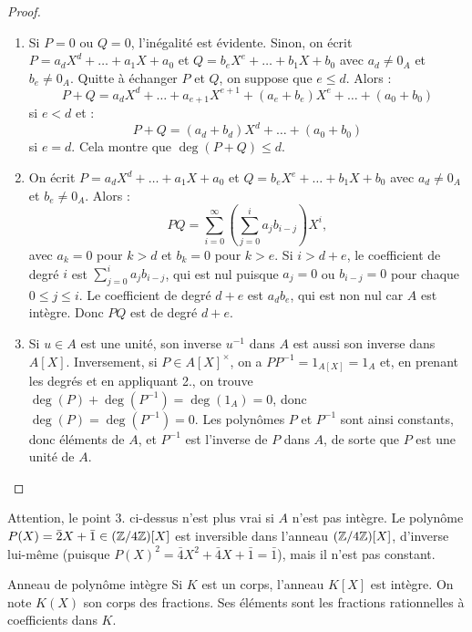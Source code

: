 \documentclass[]{report}
\begin{document}
\begin{proof}
    \begin{enumerate}
        \item Si $P = 0$ ou $Q = 0$, l'inégalité est évidente. Sinon, on écrit $P = a_d X^d + \dots + a_1 X + a_0$ et $Q = b_e X^e + \dots + b_1 X + b_0$ avec $a_d \neq 0_A$ et $b_e \neq 0_A$. Quitte à échanger $P$ et $Q$, on suppose que $e \le d$. Alors :
        \[P + Q = a_d X^d + \dots + a_{e+1} X^{e+1} + (a_e + b_e) X^e + \dots + (a_0 + b_0)\]
        si $e < d$ et :
        \[P + Q = (a_d + b_d) X^d + \dots + (a_0 + b_0)\]
        si $e = d$. Cela montre que $\deg(P + Q) \le d$.
        \item On écrit $P = a_d X^d + \dots + a_1 X + a_0$ et $Q = b_e X^e + \dots + b_1 X + b_0$ avec $a_d \neq 0_A$ et $b_e \neq 0_A$. Alors :
        \[PQ = \sum_{i=0}^{\infty} \left( \sum_{j=0}^{i} a_j b_{i-j} \right) X^i,\]
        avec $a_k = 0$ pour $k > d$ et $b_k = 0$ pour $k > e$. Si $i > d + e$, le coefficient de degré $i$ est $\sum_{j=0}^{i} a_j b_{i-j}$, qui est nul puisque $a_j = 0$ ou $b_{i-j} = 0$ pour chaque $0 \le j \le i$. Le coefficient de degré $d + e$ est $a_d b_e$, qui est non nul car $A$ est intègre. Donc $PQ$ est de degré $d + e$.
        \item Si $u \in A$ est une unité, son inverse $u^{-1}$ dans $A$ est aussi son inverse dans $A[X]$. Inversement, si $P \in A[X]^{\times}$, on a $PP^{-1} = 1_{A[X]} = 1_A$ et, en prenant les degrés et en appliquant 2., on trouve $\deg(P) + \deg(P^{-1}) = \deg(1_A) = 0$, donc $\deg(P) = \deg(P^{-1}) = 0$. Les polynômes $P$ et $P^{-1}$ sont ainsi constants, donc éléments de $A$, et $P^{-1}$ est l'inverse de $P$ dans $A$, de sorte que $P$ est une unité de $A$.
    \end{enumerate}
\end{proof}

\begin{re}{}{}
    Attention, le point 3. ci-dessus n'est plus vrai si $A$ n'est pas intègre. Le polynôme $P(X) = \bar{2}X + \bar{1} \in (\mathbb{Z}/4\mathbb{Z})[X]$ est inversible dans l'anneau $(\mathbb{Z}/4\mathbb{Z})[X]$, d'inverse lui-même (puisque $P(X)^2 = \bar{4}X^2 + \bar{4}X + \bar{1} = \bar{1}$), mais il n'est pas constant.
\end{re}

\begin{dfprop}{Anneau de polynôme intègre}{}
    Si $K$ est un corps, l'anneau $K[X]$ est intègre. On note $K(X)$ son corps des fractions. Ses éléments sont les fractions rationnelles à coefficients dans $K$.
\end{dfprop}
\end{document}

